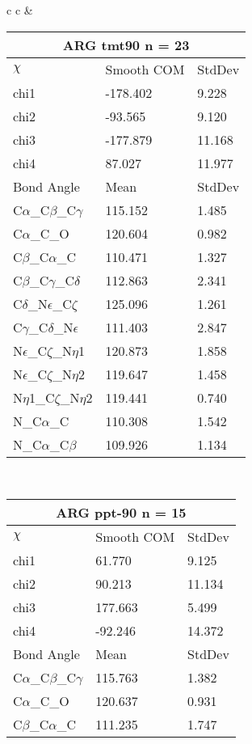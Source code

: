 \begin{longtable}{ c c }
  &
  \begin{tabular}{ l l l }
  \toprule
  \multicolumn{3}{c}{ARG \textbf{tmt90} n = 23} \\ \toprule
  $\chi$       & Smooth COM & StdDev \\ \midrule
  chi1 & -178.402 & 9.228 \\ 
  chi2 & -93.565 & 9.120 \\ 
  chi3 & -177.879 & 11.168 \\ 
  chi4 & 87.027 & 11.977 \\ \midrule
  Bond Angle   & Mean     & StdDev \\ \midrule
  C$\alpha$\_C$\beta$\_C$\gamma$ & 115.152 & 1.485\\
  C$\alpha$\_C\_O & 120.604 & 0.982\\
  C$\beta$\_C$\alpha$\_C & 110.471 & 1.327\\
  C$\beta$\_C$\gamma$\_C$\delta$ & 112.863 & 2.341\\
  C$\delta$\_N$\epsilon$\_C$\zeta$ & 125.096 & 1.261\\
  C$\gamma$\_C$\delta$\_N$\epsilon$ & 111.403 & 2.847\\
  N$\epsilon$\_C$\zeta$\_N$\eta$1 & 120.873 & 1.858\\
  N$\epsilon$\_C$\zeta$\_N$\eta$2 & 119.647 & 1.458\\
  N$\eta$1\_C$\zeta$\_N$\eta$2 & 119.441 & 0.740\\
  N\_C$\alpha$\_C & 110.308 & 1.542\\
  N\_C$\alpha$\_C$\beta$ & 109.926 & 1.134\\
  \bottomrule
  \end{tabular}
  \\
  \begin{tabular}{ l l l }
  \toprule
  \multicolumn{3}{c}{ARG \textbf{ppt-90} n = 15} \\ \toprule
  $\chi$       & Smooth COM & StdDev \\ \midrule
  chi1 & 61.770 & 9.125 \\ 
  chi2 & 90.213 & 11.134 \\ 
  chi3 & 177.663 & 5.499 \\ 
  chi4 & -92.246 & 14.372 \\ \midrule
  Bond Angle   & Mean     & StdDev \\ \midrule
  C$\alpha$\_C$\beta$\_C$\gamma$ & 115.763 & 1.382\\
  C$\alpha$\_C\_O & 120.637 & 0.931\\
  C$\beta$\_C$\alpha$\_C & 111.235 & 1.747\\

\end{tabular}
\end{longtable}
